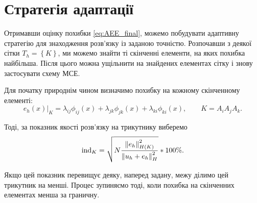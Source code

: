 
\section{Стратегія адаптації}

Отримавши оцінку похибки \eqref{eq:AEE_final}, можемо побудувати адаптивну стратегію для знаходження розв'язку із заданою точністю.
Розпочавши з деякої сітки $T_h =  \left\{ K \right\}$, ми можемо знайти ті скінченні елементи, на яких похибка найбільша.
Після цього можна ущільнити на знайдених елементах сітку і знову застосувати схему МСЕ.

Для початку природнім чином визначимо похибку на кожному скінченному елементі:
%
\newcommand{\error}[1]{\lambda_{#1} \phi_{#1}(x)}
\begin{equation}\label{eq:error_element}
	e_h(x)|_K = \error{ij}+\error{jk}+\error{ki}, \qquad K = A_iA_jA_k.
\end{equation}

Тоді, за показник якості розв'язку на трикутнику виберемо
%
\begin{equation}\label{eq:error_indicator}
	\text{ind}_K = \sqrt{N \frac
			{\left\lVert e_h\right\rVert^2_{H(K)}}
			{\left\lVert u_h+e_h\right\rVert^2_H}
	}*100\%.
\end{equation}

Якщо цей показник перевищує деяку, наперед задану, межу ділимо цей трикутник на менші.
Процес зупиняємо тоді, коли похибка на скінченних елементах менша за граничну.

\undef{\error}
